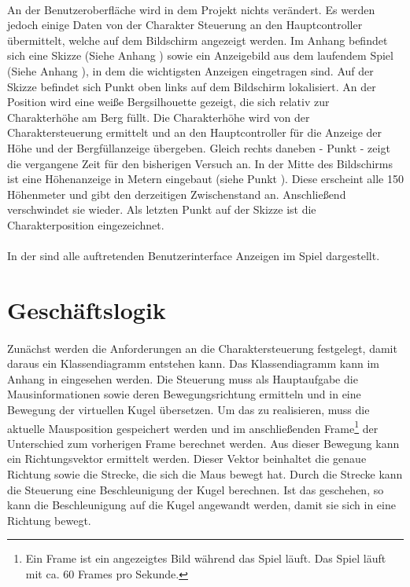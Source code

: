 \paragraph{}
An der Benutzeroberfläche wird in dem Projekt nichts verändert. Es werden jedoch einige Daten von der Charakter Steuerung an den Hauptcontroller übermittelt, welche auf dem Bildschirm angezeigt werden. Im Anhang befindet sich eine Skizze (Siehe Anhang ) sowie ein Anzeigebild aus dem laufendem Spiel (Siehe Anhang ), in dem die wichtigsten Anzeigen eingetragen sind. Auf der Skizze befindet sich Punkt  oben links auf dem Bildschirm lokalisiert. An der Position wird eine weiße Bergsilhouette gezeigt, die sich relativ zur Charakterhöhe am Berg füllt. Die Charakterhöhe wird von der Charaktersteuerung ermittelt und an den Hauptcontroller für die Anzeige der Höhe und der Bergfüllanzeige übergeben. Gleich rechts daneben - Punkt  - zeigt die vergangene Zeit für den bisherigen Versuch an. In der Mitte des Bildschirms ist eine Höhenanzeige in Metern eingebaut (siehe Punkt ). Diese erscheint alle 150 Höhenmeter und gibt den derzeitigen Zwischenstand an. Anschließend verschwindet sie wieder. Als letzten Punkt auf der Skizze ist die Charakterposition eingezeichnet.
\paragraph{}
In der  sind alle auftretenden Benutzerinterface Anzeigen im Spiel dargestellt.

\section{Geschäftslogik}
\paragraph{}
Zunächst werden die Anforderungen an die Charaktersteuerung festgelegt, damit daraus ein Klassendiagramm entstehen kann. Das Klassendiagramm kann im Anhang in  eingesehen werden. Die Steuerung muss als Hauptaufgabe die Mausinformationen sowie deren Bewegungsrichtung ermitteln und in eine Bewegung der virtuellen Kugel übersetzen. Um das zu realisieren, muss die aktuelle Mausposition gespeichert werden und im anschließenden Frame\footnote{Ein Frame ist ein angezeigtes Bild während das Spiel läuft. Das Spiel läuft mit ca. 60 Frames pro Sekunde.} der Unterschied zum vorherigen Frame berechnet werden. Aus dieser Bewegung kann ein Richtungsvektor ermittelt werden. Dieser Vektor beinhaltet die genaue Richtung sowie die Strecke, die sich die Maus bewegt hat. Durch die Strecke kann die Steuerung eine Beschleunigung der Kugel berechnen. Ist das geschehen, so kann die Beschleunigung auf die Kugel angewandt werden, damit sie sich in eine Richtung bewegt.

